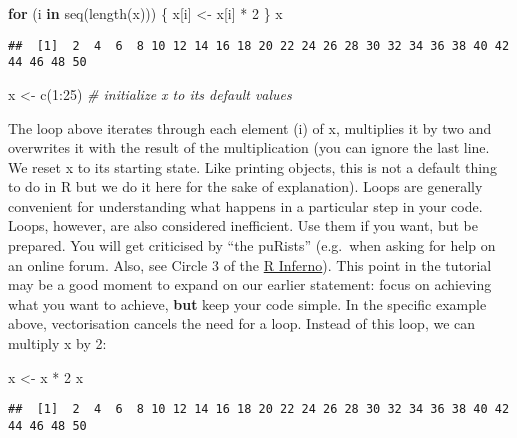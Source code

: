 \documentclass[
]{article}
\newenvironment{Shaded}{\begin{snugshade}}{\end{snugshade}}
\newcommand{\CommentTok}[1]{\textcolor[rgb]{0.56,0.35,0.01}{\textit{#1}}}
\newcommand{\ControlFlowTok}[1]{\textcolor[rgb]{0.13,0.29,0.53}{\textbf{#1}}}
\newcommand{\DecValTok}[1]{\textcolor[rgb]{0.00,0.00,0.81}{#1}}
\newcommand{\FunctionTok}[1]{\textcolor[rgb]{0.00,0.00,0.00}{#1}}
\newcommand{\NormalTok}[1]{#1}
\newcommand{\OtherTok}[1]{\textcolor[rgb]{0.56,0.35,0.01}{#1}}
\newcommand{\SpecialCharTok}[1]{\textcolor[rgb]{0.00,0.00,0.00}{#1}}
\begin{document}
\begin{Shaded}
\begin{Highlighting}[]
\ControlFlowTok{for}\NormalTok{ (i }\ControlFlowTok{in} \FunctionTok{seq}\NormalTok{(}\FunctionTok{length}\NormalTok{(x))) \{}
\NormalTok{    x[i] }\OtherTok{\textless{}{-}}\NormalTok{ x[i] }\SpecialCharTok{*} \DecValTok{2}
\NormalTok{\}}
\NormalTok{x}
\end{Highlighting}
\end{Shaded}

\begin{verbatim}
##  [1]  2  4  6  8 10 12 14 16 18 20 22 24 26 28 30 32 34 36 38 40 42 44 46 48 50
\end{verbatim}

\begin{Shaded}
\begin{Highlighting}[]
\NormalTok{x }\OtherTok{\textless{}{-}} \FunctionTok{c}\NormalTok{(}\DecValTok{1}\SpecialCharTok{:}\DecValTok{25}\NormalTok{) }\CommentTok{\# initialize x to its default values}
\end{Highlighting}
\end{Shaded}

The loop above iterates through each element (i) of x, multiplies it by
two and overwrites it with the result of the multiplication (you can
ignore the last line. We reset x to its starting state. Like printing
objects, this is not a default thing to do in R but we do it here for
the sake of explanation). Loops are generally convenient for
understanding what happens in a particular step in your code. Loops,
however, are also considered inefficient. Use them if you want, but be
prepared. You will get criticised by ``the puRists'' (e.g.~when asking
for help on an online forum. Also, see Circle 3 of the
\href{https://www.burns-stat.com/pages/Tutor/R_inferno.pdf}{R Inferno}).
This point in the tutorial may be a good moment to expand on our earlier
statement: focus on achieving what you want to achieve, \textbf{but}
keep your code simple. In the specific example above, vectorisation
cancels the need for a loop. Instead of this loop, we can multiply x by
2:

\begin{Shaded}
\begin{Highlighting}[]
\NormalTok{x }\OtherTok{\textless{}{-}}\NormalTok{ x }\SpecialCharTok{*} \DecValTok{2}
\NormalTok{x}
\end{Highlighting}
\end{Shaded}

\begin{verbatim}
##  [1]  2  4  6  8 10 12 14 16 18 20 22 24 26 28 30 32 34 36 38 40 42 44 46 48 50
\end{verbatim}
\end{document}
